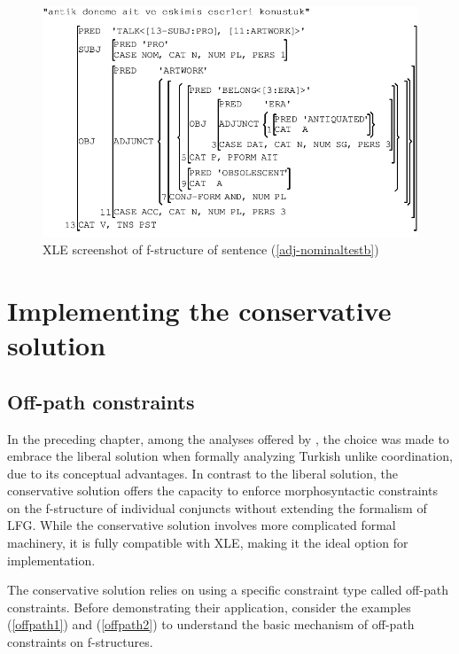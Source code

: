 \begin{figure}[H]
	\centering
	\includegraphics[width=0.73\linewidth]{images/implementation/fstr:nomadj1}
	\caption{XLE screenshot of f-structure of sentence (\ref{adj-nominaltestb})}
	\label{fig:fstrnomadj1}
\end{figure}

\section{Implementing the conservative solution}
\subsection{Off-path constraints}

In the preceding chapter, among the analyses offered by \citeauthor{prz:pat:21:oup}, the choice was made to embrace the liberal solution when formally analyzing Turkish unlike coordination, due to its conceptual advantages. In contrast to the liberal solution, the conservative solution offers the capacity to enforce morphosyntactic constraints on the f-structure of individual conjuncts without extending the formalism of LFG. While the conservative solution involves more complicated formal machinery, it is fully compatible with XLE, making it the ideal option for implementation.

The conservative solution relies on using a specific constraint type called off-path constraints. Before demonstrating their application, consider the examples (\ref{offpath1}) and (\ref{offpath2}) to understand the basic mechanism of off-path constraints on f-structures.

